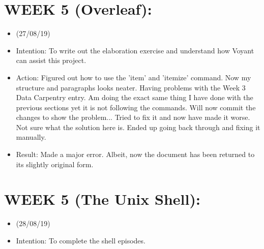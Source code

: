 \documentclass[a4paper,12pt]{article}
\begin{document}
\section{WEEK 5 (Overleaf):}

\begin{itemize}
    \item 

(27/08/19)

\item {Intention: To write out the elaboration exercise and understand how Voyant can assist this project.}

\item {Action: Figured out how to use the 'item' and 'itemize' command. Now my structure and paragraphs looks neater. Having problems with the Week 3 Data Carpentry entry. Am doing the exact same thing I have done with the previous sections yet it is not following the commands. Will now commit the changes to show the problem... Tried to fix it and now have made it worse. Not sure what the solution here is. Ended up going back through and fixing it manually.}

\item {Result: Made a major error. Albeit, now the document has been returned to its slightly original form.}

\end{itemize}

\section{WEEK 5 (The Unix Shell):}

\begin{itemize}
    \item 

(28/08/19)

\item Intention: To complete the shell episodes. 
    
    
    
    
\end{itemize}
\end{document}
